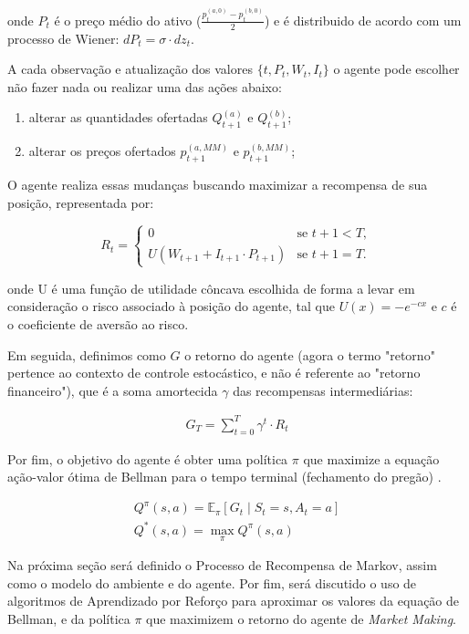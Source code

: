 onde $P_{t}$ é o preço médio do ativo ($\frac{p_{t}^{(a, 0)} - p_{t}^{(b, 0)}}{2}$) e é distribuido de acordo com um processo de Wiener: $dP_t = \sigma \cdot dz_t$.

A cada observação e atualização dos valores $\{t, P_{t}, W_{t}, I_{t}\}$ o agente pode escolher não fazer nada ou realizar uma das ações abaixo:
\begin{enumerate}
    \item alterar as quantidades ofertadas $Q^{(a)}_{t + 1}$ e $Q^{(b)}_{t + 1}$;
    \item alterar os preços ofertados $p^{(a, MM)}_{t + 1}$ e $p^{(b, MM)}_{t + 1}$;
\end{enumerate}

O agente realiza essas mudanças buscando maximizar a recompensa de sua posição, representada por:

\[
R_{t} =
\begin{cases}
	0 & \text{se } t + 1 < T, \\
	U(W_{t + 1} + I_{t + 1} \cdot P_{t + 1}) & \text{se } t + 1 = T.
\end{cases}
\]

onde U é uma função de utilidade côncava escolhida de forma a levar em consideração o risco associado à posição do agente, tal que $U(x) = -e^{-c x}$ e $c$ é o coeficiente de aversão ao risco.

Em seguida, definimos como $G$ o retorno do agente (agora o termo "retorno" pertence ao contexto de controle estocástico, e não é referente ao "retorno financeiro"), que é a soma amortecida $\gamma$ das recompensas intermediárias:

\begin{equation}
	\begin{aligned}
		G_{T} = \sum_{t=0}^{T} \gamma^t \cdot R_t
	\end{aligned}
\end{equation}

Por fim, o objetivo do agente é obter uma política $\pi$ que maximize a equação ação-valor ótima de Bellman para o tempo terminal (fechamento do pregão) \citep{Sutton2018}.

\begin{equation}
	\begin{aligned}
		Q^{\pi}(s, a) = \mathbb{E}_{\pi} \left[ G_t \mid S_{t} = s, A_{t} = a \right]\\
		Q^{*}(s, a) = \max_{\pi} Q^{\pi}(s, a)		
	\end{aligned}
\end{equation}

Na próxima seção será definido o Processo de Recompensa de Markov, assim como o modelo do ambiente e do agente. Por fim, será discutido o uso de algoritmos de Aprendizado por Reforço para aproximar os valores da equação de Bellman, e da política $\pi$ que maximizem o retorno do agente de \textit{Market Making}.
